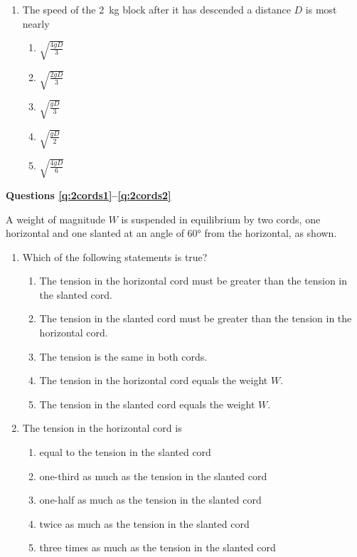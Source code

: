 \documentclass{../../../oss-apphys}
\begin{document}
\begin{multicols}{2}
\begin{enumerate}[resume,leftmargin=18pt]
  \item The speed of the \SI{2}{\kilo\gram} block after it has descended a
    distance $D$ is most nearly
    \begin{enumerate}[nosep,leftmargin=18pt,label=(\Alph*)]
    \item $\displaystyle\sqrt{\frac{4gD}{3}}$
    \item $\displaystyle\sqrt{\frac{2gD}{3}}$
    \item $\displaystyle\sqrt{\frac{gD}{3}}$
    \item $\displaystyle\sqrt{\frac{gD}{2}}$
    \item $\displaystyle\sqrt{\frac{4gD}{6}}$
    \end{enumerate}
    \label{q:pulley2}
  \end{enumerate}
  \columnbreak
  
  \textbf{Questions \ref{q:2cords1}--\ref{q:2cords2}}

  A weight of magnitude $W$ is suspended in equilibrium by two cords, one
  horizontal and one slanted at an angle of \ang{60} from the horizontal, as
  shown.
  
  \begin{enumerate}[resume,leftmargin=18pt]
  \item Which of the following statements is true?
    \begin{enumerate}[nosep,leftmargin=18pt,label=(\Alph*)]
    \item The tension in the horizontal cord must be greater than the tension
      in the slanted cord.
    \item The tension in the slanted cord must be greater than the tension in
      the horizontal cord.
    \item The tension is the same in both cords.
    \item The tension in the horizontal cord equals the weight $W$.
    \item The tension in the slanted cord equals the weight $W$.
    \end{enumerate}
    \label{q:2cords1}
    \vspace{.7in}
    
  \item The tension in the horizontal cord is
    \begin{enumerate}[nosep,leftmargin=18pt,label=(\Alph*)]
    \item equal to the tension in the slanted cord
    \item one-third as much as the tension in the slanted cord
    \item one-half as much as the tension in the slanted cord
    \item twice as much as the tension in the slanted cord
    \item three times as much as the tension in the slanted cord
    \end{enumerate}
    \label{q:2cords2}


\end{enumerate}
\end{multicols}
\end{document}
